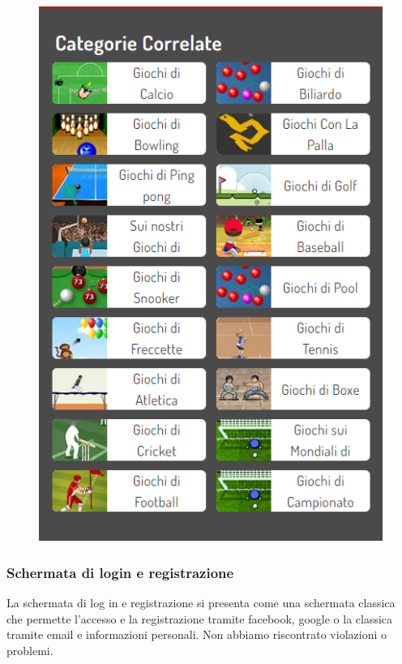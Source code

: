 \documentclass[../Report.tex]{subfiles}
\begin{document}
    \begin{figure}[H]
        \includegraphics[width=\linewidth]{Assestment12.png}
        \centering
    \end{figure}

    \subsubsection{Schermata di login e registrazione}

    La schermata di log in e registrazione si presenta come una schermata classica che permette l’accesso  e la registrazione tramite facebook, google o la classica tramite email e informazioni personali.
    Non abbiamo riscontrato violazioni o problemi. 
\end{document}
